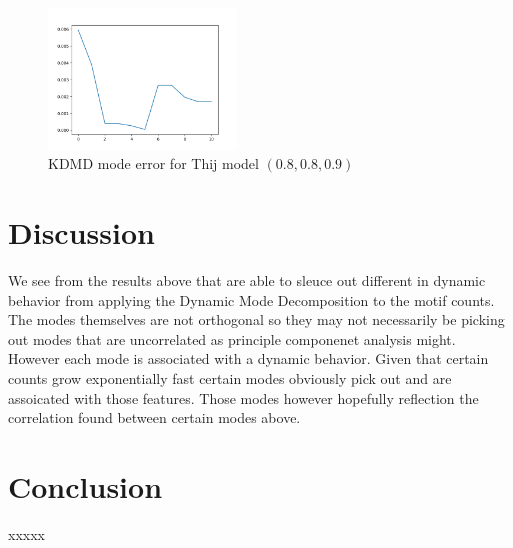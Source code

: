 \begin{figure}
    \includegraphics[width=5cm]{Images/mode_error_kdmd_twitter_080809.png}
    \centering
    \caption{KDMD mode error for Thij model $(0.8,0.8,0.9)$}
\end{figure}

\chapter{Discussion}
We see from the results above that are able to sleuce out different in dynamic behavior from applying
the Dynamic Mode Decomposition to the motif counts. The modes themselves are not orthogonal so they
may not necessarily be picking out modes that are uncorrelated as principle componenet analysis might. 
However each mode is associated with a dynamic behavior. Given that certain counts grow exponentially 
fast certain modes obviously pick out and are assoicated with those features. Those modes however 
hopefully reflection the correlation found between certain modes above.

\chapter{Conclusion}
xxxxx